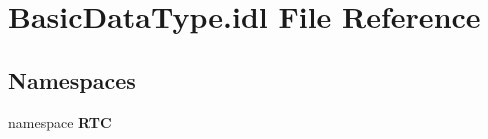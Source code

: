 \section{Basic\-Data\-Type.idl File Reference}
\label{BasicDataType_8idl}
\subsection*{Namespaces}
\begin{CompactItemize}
\item 
namespace {\bf RTC}
\end{CompactItemize}
